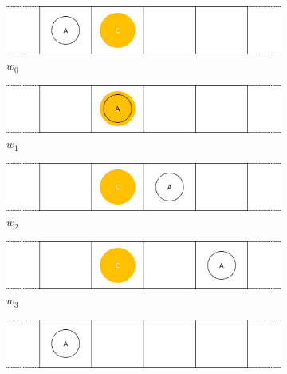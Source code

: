 \begin{figure}[H]
  \centering
  \begin{subfigure}{0.48\textwidth}
    \centering
    \includegraphics[width=\textwidth]{5BeyondSBDRLGlobalAlgebras/Images/Consumable_world_states/w0.png}
    \caption{$w_{0}$}
    \label{fig:w0}
  \end{subfigure}%
  \hfill
  \begin{subfigure}{0.48\textwidth}
    \centering
    \includegraphics[width=\textwidth]{5BeyondSBDRLGlobalAlgebras/Images/Consumable_world_states/w1.png}
    \caption{$w_{1}$}
    \label{fig:w1}
  \end{subfigure}%
  \vspace{0.5cm}
  \begin{subfigure}{0.48\textwidth}
    \centering
    \includegraphics[width=\textwidth]{5BeyondSBDRLGlobalAlgebras/Images/Consumable_world_states/w2.png}
    \caption{$w_{2}$}
    \label{fig:w2}
  \end{subfigure}%
  \hfill
  \begin{subfigure}{0.48\textwidth}
    \centering
    \includegraphics[width=\textwidth]{5BeyondSBDRLGlobalAlgebras/Images/Consumable_world_states/w3.png}
    \caption{$w_{3}$}
    \label{fig:w3}
  \end{subfigure}%
  \vspace{0.5cm}
  \begin{subfigure}{0.48\textwidth}
    \centering
    \includegraphics[width=\textwidth]{5BeyondSBDRLGlobalAlgebras/Images/Consumable_world_states/w4.png}

\end{subfigure}
\end{figure}
